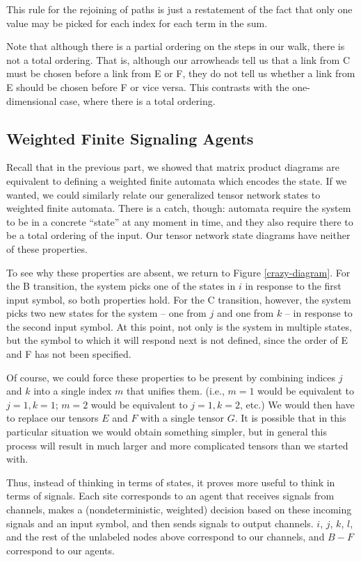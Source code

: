 \documentclass[12pt]{amsbook}
\theoremstyle{plain}
\theoremstyle{definition}
\theoremstyle{remark}
\begin{document}
This rule for the rejoining of paths is just a restatement of the fact that only one value may be picked for each index for each term in the sum.

Note that although there is a partial ordering on the steps in our walk, there is not a total ordering.  That is, although our arrowheads tell us that a link from C must be chosen before a link from E or F, they do not tell us whether a link from E should be chosen before F or vice versa.  This contrasts with the one-dimensional case, where there is a total ordering.
\subsection{Weighted Finite Signaling Agents}

Recall that in the previous part, we showed that matrix product diagrams are equivalent to defining a weighted finite automata which encodes the state.  If we wanted, we could similarly relate our generalized tensor network states to weighted finite automata.  There is a catch, though:  automata require the system to be in a concrete ``state'' at any moment in time, and they also require there to be a total ordering of the input.  Our tensor network state diagrams have neither of these properties.

To see why these properties are absent, we return to Figure \ref{crazy-diagram}.  For the B transition, the system picks one of the states in $i$ in response to the first input symbol, so both properties hold.  For the C transition, however, the system picks two new states for the system -- one from $j$ and one from $k$ -- in response to the second input symbol.  At this point, not only is the system in multiple states, but the symbol to which it will respond next is not defined, since the order of E and F has not been specified.

Of course, we could force these properties to be present by combining indices $j$ and $k$ into a single index $m$ that unifies them.  (i.e., $m=1$ would be equivalent to $j=1, k=1$;  $m=2$ would be equivalent to $j=1,k=2$, etc.)  We would then have to replace our tensors $E$ and $F$ with a single tensor $G$.  It is possible that in this particular situation we would obtain something simpler, but in general this process will result in much larger and more complicated tensors than we started with.

Thus, instead of thinking in terms of states, it proves more useful to think in terms of signals.  Each site corresponds to an agent that receives signals from channels, makes a (nondeterministic, weighted) decision based on these incoming signals and an input symbol, and then sends signals to output channels.  $i$, $j$, $k$, $l$, and the rest of the unlabeled nodes above correspond to our channels, and $B-F$ correspond to our agents.
\end{document}
